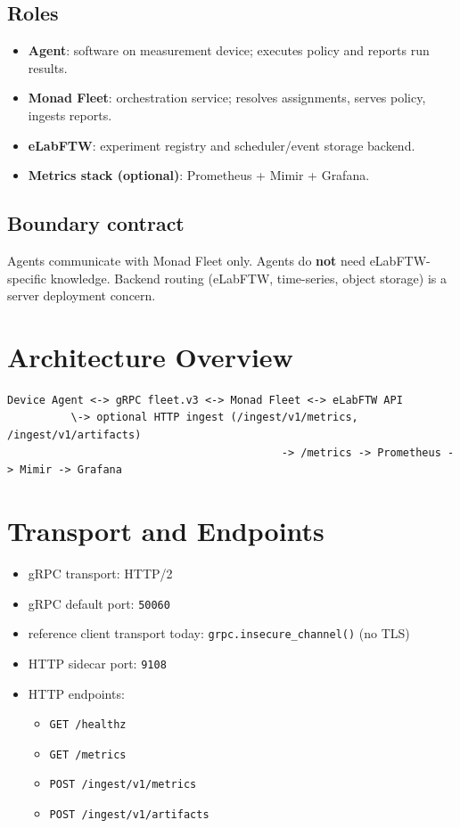 \documentclass[11pt,a4paper]{article}
\begin{document}
\subsection{Roles}
\begin{itemize}
  \item \textbf{Agent}: software on measurement device; executes policy and reports run results.
  \item \textbf{Monad Fleet}: orchestration service; resolves assignments, serves policy, ingests reports.
  \item \textbf{eLabFTW}: experiment registry and scheduler/event storage backend.
  \item \textbf{Metrics stack (optional)}: Prometheus + Mimir + Grafana.
\end{itemize}

\subsection{Boundary contract}
Agents communicate with Monad Fleet only.
Agents do \textbf{not} need eLabFTW-specific knowledge.
Backend routing (eLabFTW, time-series, object storage) is a server deployment concern.

\section{Architecture Overview}
\begin{verbatim}
Device Agent <-> gRPC fleet.v3 <-> Monad Fleet <-> eLabFTW API
          \-> optional HTTP ingest (/ingest/v1/metrics, /ingest/v1/artifacts)
                                           -> /metrics -> Prometheus -> Mimir -> Grafana
\end{verbatim}

\section{Transport and Endpoints}
\begin{itemize}
  \item gRPC transport: HTTP/2
  \item gRPC default port: \texttt{50060}
  \item reference client transport today: \texttt{grpc.insecure\_channel()} (no TLS)
  \item HTTP sidecar port: \texttt{9108}
  \item HTTP endpoints:
    \begin{itemize}
      \item \texttt{GET /healthz}
      \item \texttt{GET /metrics}
      \item \texttt{POST /ingest/v1/metrics}
      \item \texttt{POST /ingest/v1/artifacts}
    \end{itemize}
\end{itemize}
\end{document}
